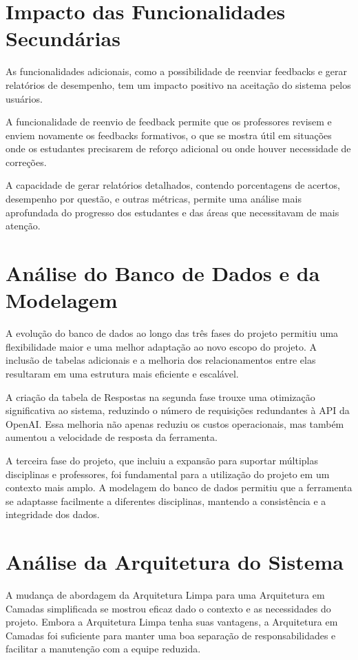 \section{Impacto das Funcionalidades Secundárias}

As funcionalidades adicionais, como a possibilidade de reenviar feedbacks e gerar relatórios de desempenho, tem um impacto positivo na aceitação do sistema pelos usuários. 

A funcionalidade de reenvio de feedback permite que os professores revisem e enviem novamente os feedbacks formativos, o que se mostra útil em situações onde os estudantes precisarem de reforço adicional ou onde houver necessidade de correções.

A capacidade de gerar relatórios detalhados, contendo porcentagens de acertos, desempenho por questão, e outras métricas, permite uma análise mais aprofundada do progresso dos estudantes e das áreas que necessitavam de mais atenção.

\section{Análise do Banco de Dados e da Modelagem}

A evolução do banco de dados ao longo das três fases do projeto permitiu uma flexibilidade maior e uma melhor adaptação ao novo escopo do projeto. A inclusão de tabelas adicionais e a melhoria dos relacionamentos entre elas resultaram em uma estrutura mais eficiente e escalável.

A criação da tabela de Respostas na segunda fase trouxe uma otimização significativa ao sistema, reduzindo o número de requisições redundantes à API da OpenAI. Essa melhoria não apenas reduziu os custos operacionais, mas também aumentou a velocidade de resposta da ferramenta.

A terceira fase do projeto, que incluiu a expansão para suportar múltiplas disciplinas e professores, foi fundamental para a utilização do projeto em um contexto mais amplo. A modelagem do banco de dados permitiu que a ferramenta se adaptasse facilmente a diferentes disciplinas, mantendo a consistência e a integridade dos dados.

\section{Análise da Arquitetura do Sistema}

A mudança de abordagem da Arquitetura Limpa para uma Arquitetura em Camadas simplificada se mostrou eficaz dado o contexto e as necessidades do projeto. Embora a Arquitetura Limpa tenha suas vantagens, a Arquitetura em Camadas foi suficiente para manter uma boa separação de responsabilidades e facilitar a manutenção com a equipe reduzida.

